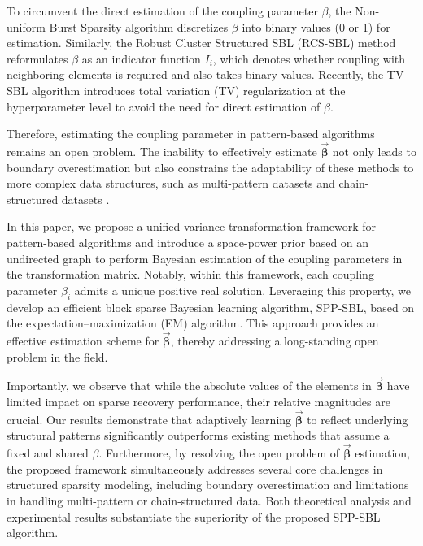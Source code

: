 \documentclass[lettersize,journal]{IEEEtran}
\theoremstyle{remark}
\begin{document}
To circumvent the direct estimation of the coupling parameter ${\beta}$, the Non-uniform Burst Sparsity algorithm \cite{dai2018non} discretizes ${\beta}$ into binary values (0 or 1) for estimation. Similarly, the Robust Cluster Structured SBL (RCS-SBL) method \cite{wang2020structured} reformulates ${\beta}$ as an indicator function $I_i$, which denotes whether coupling with neighboring elements is required and also takes binary values. Recently, the TV-SBL algorithm \cite{sant2022block} introduces total variation (TV) regularization at the hyperparameter level to avoid the need for direct estimation of ${\beta}$.





Therefore, estimating the coupling parameter in pattern-based algorithms remains an open problem. The inability to effectively estimate \(\vec{\boldsymbol{\beta}}\) not only leads to boundary overestimation \cite{dai2018non,wang2018alternative, wang2020structured} but also constrains the adaptability of these methods to more complex data structures, such as multi-pattern datasets \cite{sant2022block} and chain-structured datasets \cite{korki2016iterative}.


In this paper, we propose a unified variance transformation framework for pattern-based algorithms and introduce a space-power prior based on an undirected graph to perform Bayesian estimation of the coupling parameters in the transformation matrix. Notably, within this framework, each coupling parameter $\beta_i$
admits a unique positive real solution. Leveraging this property, we develop an efficient block sparse Bayesian learning algorithm, SPP-SBL, based on the expectation–maximization (EM) algorithm. This approach provides an effective estimation scheme for $\vec{\boldsymbol{\beta}}$, thereby addressing a long-standing open problem in the field.

Importantly, we observe that while the absolute values of the elements in $\vec{\boldsymbol{\beta}}$ have limited impact on sparse recovery performance, their relative magnitudes are crucial. Our results demonstrate that adaptively learning $\vec{\boldsymbol{\beta}}$ to reflect underlying structural patterns significantly outperforms existing methods that assume a fixed and shared $\beta$. Furthermore, by resolving the open problem of $\vec{\boldsymbol{\beta}}$ estimation, the proposed framework simultaneously addresses several core challenges in structured sparsity modeling, including boundary overestimation and limitations in handling multi-pattern or chain-structured data. Both theoretical analysis and experimental results substantiate the superiority of the proposed SPP-SBL algorithm.
\end{document}
